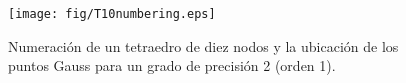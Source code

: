 \begin{figure}[htb!]
	\centering
	\texttt{[image: fig/T10numbering.eps]}
	\caption{Numeración de un tetraedro de diez nodos y la ubicación de los puntos Gauss para un grado de precisión 2 (orden 1).}
	\label{fig:T10numbering}
\end{figure}


%




